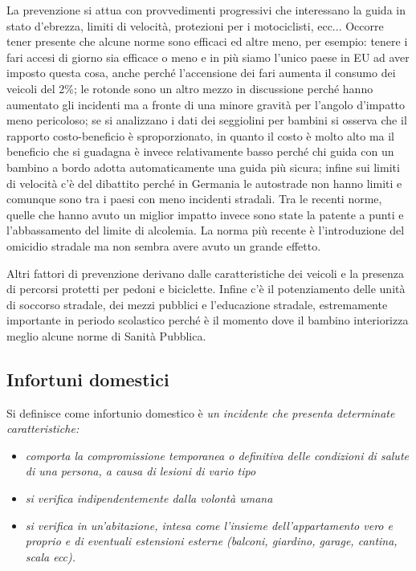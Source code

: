 La prevenzione si attua con provvedimenti progressivi che interessano la
guida in stato d'ebrezza, limiti di velocità, protezioni per i
motociclisti, ecc... Occorre tener presente che alcune norme sono
efficaci ed altre meno, per esempio: tenere i fari accesi di giorno sia
efficace o meno e in più siamo l'unico paese in EU ad aver imposto
questa cosa, anche perché l'accensione dei fari aumenta il consumo dei
veicoli del 2\%; le rotonde sono un altro mezzo in discussione perché
hanno aumentato gli incidenti ma a fronte di una minore gravità per
l'angolo d'impatto meno pericoloso; se si analizzano i dati dei
seggiolini per bambini si osserva che il rapporto costo-beneficio è
sproporzionato, in quanto il costo è molto alto ma il beneficio che si
guadagna è invece relativamente basso perché chi guida con un bambino a
bordo adotta automaticamente una guida più sicura; infine sui limiti di
velocità c'è del dibattito perché in Germania le autostrade non hanno
limiti e comunque sono tra i paesi con meno incidenti stradali. Tra le
recenti norme, quelle che hanno avuto un miglior impatto invece sono
state la patente a punti e l'abbassamento del limite di alcolemia. La
norma più recente è l'introduzione del omicidio stradale ma non sembra
avere avuto un grande effetto.

Altri fattori di prevenzione derivano dalle caratteristiche dei veicoli
e la presenza di percorsi protetti per pedoni e biciclette. Infine c'è
il potenziamento delle unità di soccorso stradale, dei mezzi pubblici e
l'educazione stradale, estremamente importante in periodo scolastico
perché è il momento dove il bambino interiorizza meglio alcune norme di
Sanità Pubblica.

\subsection{Infortuni domestici}

Si definisce come infortunio domestico è \emph{un incidente che presenta
determinate caratteristiche:}

\begin{itemize}
\item \emph{comporta la compromissione temporanea o definitiva delle
condizioni di salute di una persona, a causa di lesioni di vario tipo}
\item \emph{si verifica indipendentemente dalla volontà umana}
\item \emph{si verifica in un'abitazione, intesa come l'insieme
dell'appartamento vero e proprio e di eventuali estensioni esterne
(balconi, giardino, garage, cantina, scala ecc).}
\end{itemize}

